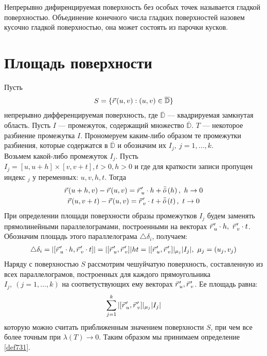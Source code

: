 \begin{definition}
  Непрерывно дифиренцируемая поверхность без особых точек называется гладкой
  поверхностью. Объединение конечного числа гладких поверхностей назовем
  кусочно гладкой поверхностью, она может состоять из парочки кусков.
\end{definition}

\section{Площадь поверхности}
Пусть
\begin{gather}
  S = \{\pvec r(u, v) : (u, v) \in \overline{\mathbb{D}}\}
  \label{ch73:eq1}
\end{gather}
непрерывно дифференцируемая поверхность, где $\overline{\mathbb{D}}$ ---
квадрируемая замкнутая область. Пусть $I$ --- промежуток, содержащий множество
$\overline{\mathbb{D}}$. $T$ --- некоторое разбиение промежутка $I$.
Прономеруем каким-либо образом те промежутки разбиения, которые содержатся в
$\overline{\mathbb{D}}$ и обозначим их $I_j, \ j = 1, \dots, k$. \\ Возьмем
какой-либо промежуток $I_j$.
Пусть $I_j = [u, u + h] \times [v, v + t], t > 0,
h > 0$ и где для краткости записи пропущен индекс ${}_j$ у переменных: $u, v, h,
t$. Тогда
\begin{gather*}
  \pvec r(u + h, v) - \pvec r(u, v) = \pvec r_u' \cdot h +
  \bar{\bar{o}}\left(h\right), \ h \to 0 \\
  \pvec r(u, v + t) - \pvec r(u, v) = \pvec r_v' \cdot t +
  \bar{\bar{o}}\left(t\right), \ t \to 0
\end{gather*}
При определении площади поверхности образы промежутков $I_j$ будем заменять
прямолинейными параллелограмами, построенными на векторах $\pvec r_u' \cdot h,
\ \pvec r_v' \cdot t$. Обозначим площадь этого параллелограма
$\triangle\delta_i$, получаем:
\begin{gather*}
  \triangle \delta_i = |[\pvec r_u' \cdot h, \pvec r_v' \cdot t]| = |[\pvec
  r_u', \pvec r_v']| ht = |[\pvec r_u', \pvec r_v']|_{\mu_j}|I_j|, \ \mu_j =
  (u_j, v_j)
\end{gather*}
Наряду с поверхностью $S$ рассмотрим чешуйчатую поверхность, составленную из
всех параллелограмов, построенных для каждого прямоугольника $I_j, \ (j = 1,
\dots, k)$ на соответуствующих ему векторах $\pvec r_u', \pvec r_v'$. Ее
площадь равна:
\begin{gather*}
  \sum\limits_{j = 1}^{k} |[\pvec r_u', \pvec r_v']|_{\mu_j}|I_j|
\end{gather*}
которую можно считать приближенным значением поверхности $S$, при чем все более
точным при $\lambda(T) \to 0$. Таким образом мы принимаем определение
\eqref{def731}.

